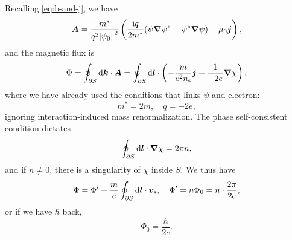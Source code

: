 \documentclass[hyperref, a4paper]{article}
\newcommand*{\ii}{\mathrm{i}}
\begin{document}
Recalling \eqref{eq:b-and-j}, we have 
\begin{equation}
    \vb*{A} = \frac{m^*}{q^2 \abs*{\psi_0}^2} \left(
        \frac{\ii q}{2 m^*} (\psi \grad{\psi^*} - \psi^* \grad{\psi})
        - \mu_0 \vb*{j}
    \right), 
\end{equation}
and the magnetic flux is 
\begin{equation}
    \Phi = \oint_{\partial{S}} \dd{\vb*{k}} \cdot \vb*{A}
    = \oint_{\partial S} \dd{\vb*{l}} \cdot \left(
        - \frac{m}{e^2 n_{\text{s}}} \vb*{j} + \frac{1}{-2e} \grad{\chi}
    \right),
\end{equation}
where we have already used the conditions that links $\psi$ and electron:
\begin{equation}
    m^* = 2 m, \quad q = - 2 e,
\end{equation}
ignoring interaction-induced mass renormalization.
The phase self-consistent condition dictates 
\begin{equation}
    \oint_{\partial S} \dd{\vb*{l}} \cdot \grad{\chi} = 2 \pi n,
\end{equation}
and if $n \neq 0$,
there is a singularity of $\chi$ inside $S$.
We thus have
\begin{equation}
    \Phi = \Phi' + \frac{m}{e} \oint_{\partial S} \dd{\vb*{l}} \cdot \vb*{v}_{\text{s}}, \quad 
    \Phi' = n \Phi_0 = n \cdot \frac{2 \pi}{2e},
\end{equation}
or if we have $\hbar$ back, 
\begin{equation}
    \Phi_0 = \frac{h}{2e}.
\end{equation}
\end{document}

